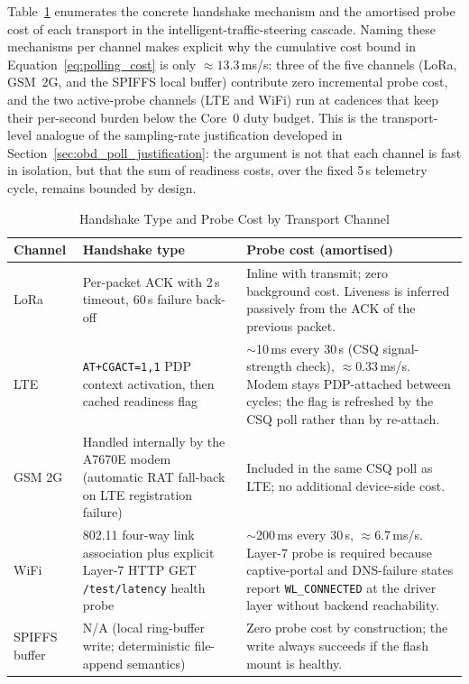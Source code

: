 Table~\ref{tab:comm_handshake_probe} enumerates the concrete handshake mechanism and the amortised probe cost of each transport in the intelligent-traffic-steering cascade. Naming these mechanisms per channel makes explicit why the cumulative cost bound in Equation~\ref{eq:polling_cost} is only $\approx 13.3$\,ms/s: three of the five channels (LoRa, GSM~2G, and the SPIFFS local buffer) contribute zero incremental probe cost, and the two active-probe channels (LTE and WiFi) run at cadences that keep their per-second burden below the Core~0 duty budget. This is the transport-level analogue of the sampling-rate justification developed in Section~\ref{sec:obd_poll_justification}: the argument is not that each channel is fast in isolation, but that the sum of readiness costs, over the fixed 5\,s telemetry cycle, remains bounded by design.

\begin{table}[!htbp]
\centering
\caption{Handshake Type and Probe Cost by Transport Channel}
\label{tab:comm_handshake_probe}
\scriptsize
\setlength{\tabcolsep}{3pt}
\renewcommand{\arraystretch}{1.20}
\begin{tabularx}{\textwidth}{|p{}|p{}|X|}
\hline
\textbf{Channel} & \textbf{Handshake type} & \textbf{Probe cost (amortised)} \\
\hline
LoRa & Per-packet ACK with 2\,s timeout, 60\,s failure back-off & Inline with transmit; zero background cost. Liveness is inferred passively from the ACK of the previous packet. \\
\hline
LTE & \texttt{AT+CGACT=1,1} PDP context activation, then cached readiness flag & $\sim$10\,ms every 30\,s (CSQ signal-strength check), $\approx$0.33\,ms/s. Modem stays PDP-attached between cycles; the flag is refreshed by the CSQ poll rather than by re-attach. \\
\hline
GSM 2G & Handled internally by the A7670E modem (automatic RAT fall-back on LTE registration failure) & Included in the same CSQ poll as LTE; no additional device-side cost. \\
\hline
WiFi & 802.11 four-way link association plus explicit Layer-7 HTTP GET \texttt{/test/latency} health probe & $\sim$200\,ms every 30\,s, $\approx$6.7\,ms/s. Layer-7 probe is required because captive-portal and DNS-failure states report \texttt{WL\_CONNECTED} at the driver layer without backend reachability. \\
\hline
SPIFFS buffer & N/A (local ring-buffer write; deterministic file-append semantics) & Zero probe cost by construction; the write always succeeds if the flash mount is healthy. \\
\hline
\end{tabularx}
\normalsize
\end{table}

